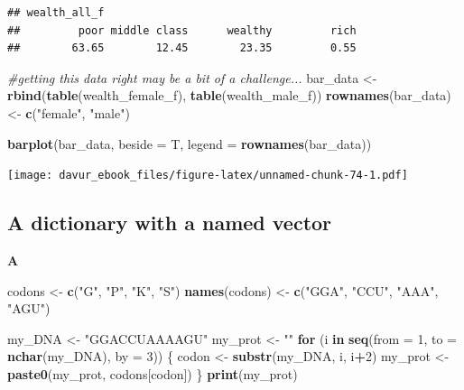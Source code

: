 \documentclass[]{book}
\newenvironment{Shaded}{\begin{snugshade}}{\end{snugshade}}
\newcommand{\CommentTok}[1]{\textcolor[rgb]{0.56,0.35,0.01}{\textit{#1}}}
\newcommand{\ControlFlowTok}[1]{\textcolor[rgb]{0.13,0.29,0.53}{\textbf{#1}}}
\newcommand{\DataTypeTok}[1]{\textcolor[rgb]{0.13,0.29,0.53}{#1}}
\newcommand{\DecValTok}[1]{\textcolor[rgb]{0.00,0.00,0.81}{#1}}
\newcommand{\KeywordTok}[1]{\textcolor[rgb]{0.13,0.29,0.53}{\textbf{#1}}}
\newcommand{\NormalTok}[1]{#1}
\newcommand{\OperatorTok}[1]{\textcolor[rgb]{0.81,0.36,0.00}{\textbf{#1}}}
\newcommand{\StringTok}[1]{\textcolor[rgb]{0.31,0.60,0.02}{#1}}
\begin{document}
\begin{verbatim}
## wealth_all_f
##         poor middle class      wealthy         rich 
##        63.65        12.45        23.35         0.55
\end{verbatim}

\begin{Shaded}
\begin{Highlighting}[]
\CommentTok{#getting this data right may be a bit of a challenge...}
\NormalTok{bar_data <-}\StringTok{ }\KeywordTok{rbind}\NormalTok{(}\KeywordTok{table}\NormalTok{(wealth_female_f), }\KeywordTok{table}\NormalTok{(wealth_male_f))}
\KeywordTok{rownames}\NormalTok{(bar_data) <-}\StringTok{ }\KeywordTok{c}\NormalTok{(}\StringTok{"female"}\NormalTok{, }\StringTok{"male"}\NormalTok{)}

\KeywordTok{barplot}\NormalTok{(bar_data, }\DataTypeTok{beside =}\NormalTok{ T, }\DataTypeTok{legend =} \KeywordTok{rownames}\NormalTok{(bar_data))}
\end{Highlighting}
\end{Shaded}

\texttt{[image: davur\_ebook\_files/figure-latex/unnamed-chunk-74-1.pdf]}

\hypertarget{a-dictionary-with-a-named-vector-1}{%
\subsection{A dictionary with a named vector}\label{a-dictionary-with-a-named-vector-1}}

\textbf{A}

\begin{Shaded}
\begin{Highlighting}[]
\NormalTok{codons <-}\StringTok{ }\KeywordTok{c}\NormalTok{(}\StringTok{"G"}\NormalTok{, }\StringTok{"P"}\NormalTok{, }\StringTok{"K"}\NormalTok{, }\StringTok{"S"}\NormalTok{)}
\KeywordTok{names}\NormalTok{(codons) <-}\StringTok{ }\KeywordTok{c}\NormalTok{(}\StringTok{"GGA"}\NormalTok{, }\StringTok{"CCU"}\NormalTok{, }\StringTok{"AAA"}\NormalTok{, }\StringTok{"AGU"}\NormalTok{)}

\NormalTok{my_DNA <-}\StringTok{ "GGACCUAAAAGU"}
\NormalTok{my_prot <-}\StringTok{ ""}
\ControlFlowTok{for}\NormalTok{ (i }\ControlFlowTok{in} \KeywordTok{seq}\NormalTok{(}\DataTypeTok{from =} \DecValTok{1}\NormalTok{, }\DataTypeTok{to =} \KeywordTok{nchar}\NormalTok{(my_DNA), }\DataTypeTok{by =} \DecValTok{3}\NormalTok{)) \{}
\NormalTok{        codon <-}\StringTok{ }\KeywordTok{substr}\NormalTok{(my_DNA, i, i}\OperatorTok{+}\DecValTok{2}\NormalTok{)}
\NormalTok{        my_prot <-}\StringTok{ }\KeywordTok{paste0}\NormalTok{(my_prot, codons[codon])}
\NormalTok{\}}
\KeywordTok{print}\NormalTok{(my_prot)}
\end{Highlighting}
\end{Shaded}
\end{document}

